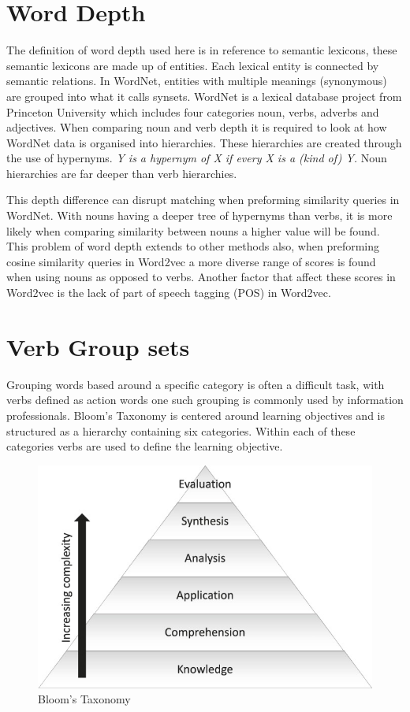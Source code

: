 \section{Word Depth} 
The definition of word depth used here is in reference to semantic lexicons, these semantic lexicons are made up of entities. Each lexical entity is connected by semantic relations. In WordNet, entities with multiple meanings (synonymous) are grouped into what it calls synsets. WordNet is a lexical database project from Princeton University which includes four categories noun, verbs, adverbs and adjectives. When comparing noun and verb depth it is required to look at how WordNet data is organised into hierarchies. These hierarchies are created through the use of hypernyms. \textit{Y is a hypernym of X if every X is a (kind of) Y.} Noun hierarchies are far deeper than verb hierarchies.

This depth difference can disrupt matching when preforming similarity queries in WordNet. With nouns having a deeper tree of hypernyms than verbs, it is more likely when comparing similarity between nouns a higher value will be found. This problem of word depth extends to other methods also, when preforming cosine similarity queries in Word2vec a more diverse range of scores is found when using nouns as opposed to verbs. Another factor that affect these scores in Word2vec is the lack of part of speech tagging (POS) in Word2vec.

\section{Verb Group sets}
Grouping words based around a specific category is often a difficult task, with verbs defined as action words one such grouping is commonly used by information professionals. Bloom's Taxonomy is centered around learning objectives and is structured as a hierarchy containing six categories. Within each of these categories verbs are used to define the learning objective.

\begin{figure}[H]
\centering
  \includegraphics[width=\textwidth]{images/bloom.jpg}
  \caption{Bloom's Taxonomy}
  \label{fig:bloom}
\end{figure}

